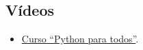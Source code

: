 \documentclass[
  spanish,
  a4paper,
]{scrreport}
\providecommand{\tightlist}{%
  \setlength{\itemsep}{0pt}\setlength{\parskip}{0pt}}
\begin{document}
\subsection{Vídeos}\label{vuxeddeos}

\begin{itemize}
\tightlist
\item
  \href{https://www.edx.org/course/programming-for-everybody-getting-started-with-python}{Curso
  ``Python para todos''}.
\end{itemize}
\end{document}
